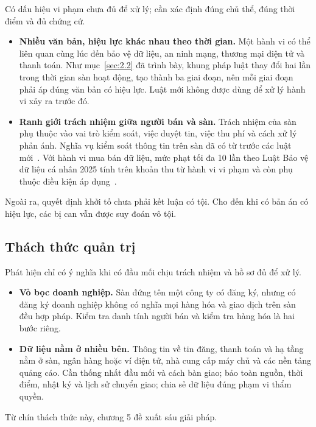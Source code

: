 Có dấu hiệu vi phạm chưa đủ để xử lý; cần xác định đúng chủ thể, đúng thời điểm và đủ chứng cứ.

\begin{itemize}
\item \textbf{Nhiều văn bản, hiệu lực khác nhau theo thời gian.} Một hành vi có thể liên quan cùng lúc đến bảo vệ dữ liệu, an ninh mạng, thương mại điện tử và thanh toán. Như mục~\ref{sec:2.2} đã trình bày, khung pháp luật thay đổi hai lần trong thời gian sàn hoạt động, tạo thành ba giai đoạn, nên mỗi giai đoạn phải áp đúng văn bản có hiệu lực. Luật mới không được dùng để xử lý hành vi xảy ra trước đó.
\item \textbf{Ranh giới trách nhiệm giữa người bán và sàn.} Trách nhiệm của sàn phụ thuộc vào vai trò kiểm soát, việc duyệt tin, việc thu phí và cách xử lý phản ánh. Nghĩa vụ kiểm soát thông tin trên sàn đã có từ trước các luật mới~\cite{vbhn-tmdt-2020}. Với hành vi mua bán dữ liệu, mức phạt tối đa 10 lần theo Luật Bảo vệ dữ liệu cá nhân 2025 tính trên khoản thu từ hành vi vi phạm và còn phụ thuộc điều kiện áp dụng~\cite{luat-bvdlcn-2025}.
\end{itemize}
Ngoài ra, quyết định khởi tố chưa phải kết luận có tội. Cho đến khi có bản án có hiệu lực, các bị can vẫn được suy đoán vô tội.

\subsection{Thách thức quản trị}\label{sec:4.3}

Phát hiện chỉ có ý nghĩa khi có đầu mối chịu trách nhiệm và hồ sơ đủ để xử lý.

\begin{itemize}
\item \textbf{Vỏ bọc doanh nghiệp.} Sàn đứng tên một công ty có đăng ký, nhưng có đăng ký doanh nghiệp không có nghĩa mọi hàng hóa và giao dịch trên sàn đều hợp pháp. Kiểm tra danh tính người bán và kiểm tra hàng hóa là hai bước riêng.
\item \textbf{Dữ liệu nằm ở nhiều bên.} Thông tin về tin đăng, thanh toán và hạ tầng nằm ở sàn, ngân hàng hoặc ví điện tử, nhà cung cấp máy chủ và các nền tảng quảng cáo. Cần thống nhất đầu mối và cách bàn giao; bảo toàn nguồn, thời điểm, nhật ký và lịch sử chuyển giao; chia sẻ dữ liệu đúng phạm vi thẩm quyền.
\end{itemize}
Từ chín thách thức này, chương 5 đề xuất sáu giải pháp.

